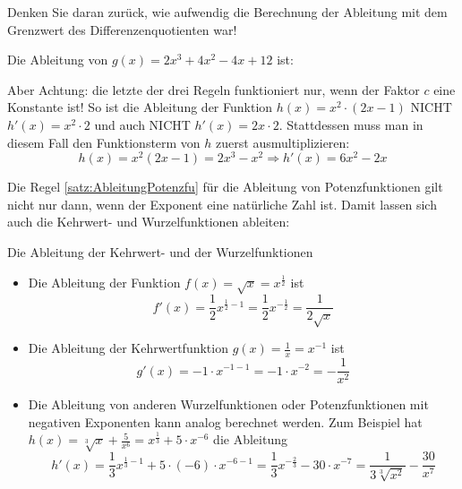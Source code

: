 Denken Sie daran zurück, wie aufwendig die Berechnung der Ableitung mit dem Grenzwert des Differenzenquotienten war!
\begin{example}
    Die Ableitung von $g(x)=2x^3+4x^2-4x+12$ ist:
\end{example}
\begin{example}
    Aber Achtung: die letzte der drei Regeln funktioniert nur, wenn der Faktor $c$ eine Konstante ist! So ist die Ableitung der Funktion $h(x)=x^2 \cdot (2x-1)$ NICHT $h'(x)=x^2\cdot 2$ und auch NICHT $h'(x)=2x\cdot 2$. Stattdessen muss man in diesem Fall den Funktionsterm von $h$ zuerst ausmultiplizieren:
    $$ h(x)=x^2(2x-1)=2x^3-x^2 \Rightarrow h'(x)=6x^2-2x$$
\end{example}
Die Regel \ref*{satz:AbleitungPotenzfu} für die Ableitung von Potenzfunktionen gilt nicht nur dann, wenn der Exponent eine natürliche Zahl ist. Damit lassen sich auch die Kehrwert- und Wurzelfunktionen ableiten:
\begin{example}
    {Die Ableitung der Kehrwert- und der Wurzelfunktionen}{}
    \begin{itemize}
        \item Die Ableitung der Funktion $f(x)=\sqrt{x} = x^{\frac{1}{2}}$ ist
              $$f'(x)=\frac{1}{2}x^{\frac{1}{2}-1}=\frac{1}{2}x^{-\frac{1}{2}}=\frac{1}{2\sqrt{x}}$$
        \item Die Ableitung der Kehrwertfunktion $g(x)=\frac{1}{x}=x^{-1}$ ist
              $$ g'(x)=-1\cdot x^{-1-1}=-1\cdot x^{-2}=-\frac{1}{x^2}$$
        \item Die Ableitung von anderen Wurzelfunktionen oder Potenzfunktionen mit negativen Exponenten kann analog berechnet werden. Zum Beispiel hat $h(x)=\sqrt[3]{x}+\frac{5}{x^6} = x^{\frac{1}{3}}+ 5\cdot x^{-6}$ die Ableitung
              $$h'(x)=\frac{1}{3}x^{\frac{1}{3}-1}+5\cdot(-6)\cdot x^{-6-1} = \frac{1}{3}x^{-\frac{2}{3}}-30\cdot x^{-7} = \frac{1}{3\sqrt[3]{x^2}}-\frac{30}{x^7}$$
    \end{itemize}

\end{example}
\clearpage
